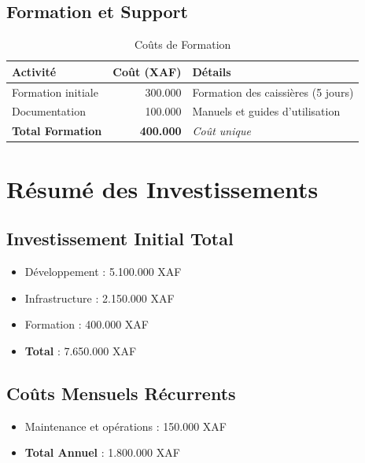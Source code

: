 \documentclass[14pt,a4paper]{report}
\begin{document}
\section{Formation et Support}
\begin{table}[h]
    \centering
    \begin{tabular}{|l|r|p{6cm}|}
        \hline
        \textbf{Activité} & \textbf{Coût (XAF)} & \textbf{Détails} \\
        \hline
        Formation initiale & 300.000 & Formation des caissières (5 jours) \\
        \hline
        Documentation & 100.000 & Manuels et guides d'utilisation \\
        \hline
        \textbf{Total Formation} & \textbf{400.000} & \textit{Coût unique} \\
        \hline
    \end{tabular}
    \caption{Coûts de Formation}
\end{table}

\chapter{Résumé des Investissements}

\section{Investissement Initial Total}
\begin{itemize}
    \item Développement : 5.100.000 XAF
    \item Infrastructure : 2.150.000 XAF
    \item Formation : 400.000 XAF
    \item \textbf{Total} : 7.650.000 XAF
\end{itemize}

\section{Coûts Mensuels Récurrents}
\begin{itemize}
    \item Maintenance et opérations : 150.000 XAF
    \item \textbf{Total Annuel} : 1.800.000 XAF
\end{itemize}
\end{document}
